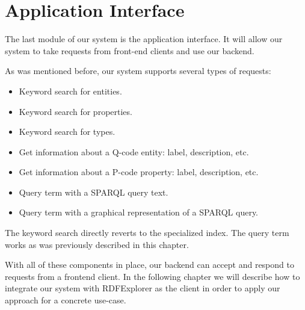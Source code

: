 \section{Application Interface}
\label{chap:api}

The last module of our system is the application interface. It will allow our system to take requests from front-end clients and use our backend.

As was mentioned before, our system supports several types of requests:
\begin{itemize}
    \item Keyword search for entities.
    \item Keyword search for properties.
    \item Keyword search for types.
    \item Get information about a Q-code entity: label, description, etc.
    \item Get information about a P-code property: label, description, etc.
    \item Query term with a SPARQL query text.
    \item Query term with a graphical representation of a SPARQL query.
\end{itemize}

The keyword search directly reverts to the specialized index. The query term works as was previously described in this chapter.

With all of these components in place, our backend can accept and respond to requests from a frontend client. In the following chapter we will describe how to integrate our system with RDFExplorer as the client in order to apply our approach for a concrete use-case.

